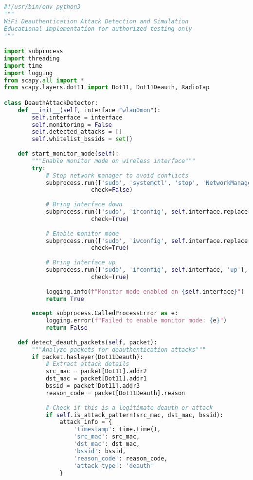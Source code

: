 \documentclass[12pt,a4paper]{report}
\begin{document}
\begin{lstlisting}[language=Python, caption=Deauthentication Attack Detector]
#!/usr/bin/env python3
"""
WiFi Deauthentication Attack Detection and Simulation
Educational implementation for authorized testing only
"""

import subprocess
import threading
import time
import logging
from scapy.all import *
from scapy.layers.dot11 import Dot11, Dot11Deauth, RadioTap

class DeauthAttackDetector:
    def __init__(self, interface="wlan0mon"):
        self.interface = interface
        self.monitoring = False
        self.detected_attacks = []
        self.whitelist_bssids = set()
        
    def start_monitor_mode(self):
        """Enable monitor mode on wireless interface"""
        try:
            # Stop network manager to avoid conflicts
            subprocess.run(['sudo', 'systemctl', 'stop', 'NetworkManager'], 
                         check=False)
            
            # Bring interface down
            subprocess.run(['sudo', 'ifconfig', self.interface.replace('mon', ''), 'down'], 
                         check=True)
            
            # Enable monitor mode
            subprocess.run(['sudo', 'iwconfig', self.interface.replace('mon', ''), 'mode', 'monitor'], 
                         check=True)
            
            # Bring interface up
            subprocess.run(['sudo', 'ifconfig', self.interface, 'up'], 
                         check=True)
            
            logging.info(f"Monitor mode enabled on {self.interface}")
            return True
            
        except subprocess.CalledProcessError as e:
            logging.error(f"Failed to enable monitor mode: {e}")
            return False
    
    def detect_deauth_packets(self, packet):
        """Analyze packets for deauthentication attacks"""
        if packet.haslayer(Dot11Deauth):
            # Extract attack details
            src_mac = packet[Dot11].addr2
            dst_mac = packet[Dot11].addr1
            bssid = packet[Dot11].addr3
            reason_code = packet[Dot11Deauth].reason
            
            # Check if this is a legitimate deauth or attack
            if self.is_attack_pattern(src_mac, dst_mac, bssid):
                attack_info = {
                    'timestamp': time.time(),
                    'src_mac': src_mac,
                    'dst_mac': dst_mac,
                    'bssid': bssid,
                    'reason_code': reason_code,
                    'attack_type': 'deauth'
                }
                

\end{lstlisting}
\end{document}

